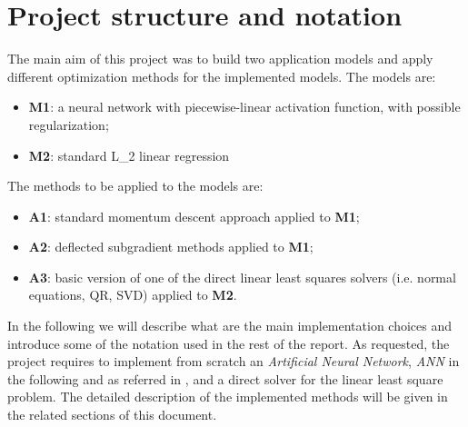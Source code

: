 \section{Project structure and notation}
The main aim of this project was to build two application models and apply different optimization methods for the implemented models.\newline
The models are:
\begin{itemize}
    \item \textbf{M1}: a neural network with piecewise-linear activation function, with possible regularization;
    \item \textbf{M2}: standard L\_2 linear regression
\end{itemize}
The methods to be applied to the models are:
\begin{itemize}
    \item \textbf{A1}: standard momentum descent approach applied to \textbf{M1};
    \item \textbf{A2}: deflected subgradient methods applied to \textbf{M1};
    \item \textbf{A3}: basic version of one of the direct linear least squares solvers (i.e. normal equations, QR, SVD) applied to \textbf{M2}.
\end{itemize}
In the following we will describe what are the main implementation choices and introduce some of the notation used in the rest of the report.\newline
As requested, the project requires to implement from scratch an \textit{Artificial Neural Network}, \textit{ANN} in the following and as referred in \cite{MLmitchell}, and a direct solver for the linear least square problem. The detailed description of the implemented methods will be given in the related sections of this document.